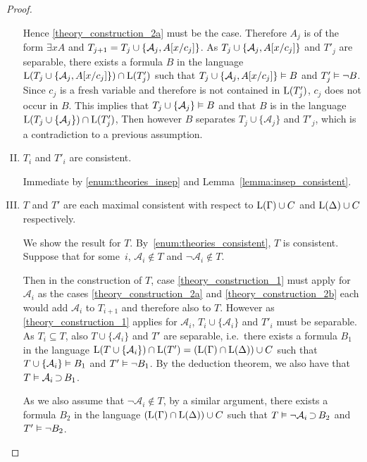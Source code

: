 \begin{proof}
\begin{enumerate}[I.]
			Hence \ref{theory_construction_2a} must be the case. Therefore $A_j$ is of the form $\exists x A$ and $T_{j+1} = T_{j} \cup \{ \mathcal{A}_{j}, A[x/c_j] \}$.
			As $T_{j} \cup \{ \mathcal{A}_{j}, A[x/c_j]  \}$ and $T'_j$ are separable, there exists a formula $B$ in the language $\operatorname{L}(T_{j} \cup \{ \mathcal{A}_{j}, A[x/c_j]  \}) \cap \operatorname{L}(T'_j)$
			such that $ T_{j} \cup \{ \mathcal{A}_{j}, A[x/c_j] \} \vDash B$ and $T'_j \vDash \lnot B$.
			Since $c_j$ is a fresh variable and therefore is not contained in $\operatorname{L}(T'_j)$, $c_j$ does not occur in $B$.
			This implies that $T_j \cup \{\mathcal{A}_j\} \vDash B$ and
			that $B$ is in the language $\operatorname{L}(T_{j} \cup \{ \mathcal{A}_{j}\}) \cap \operatorname{L}(T'_j)$,
			Then however $B$ separates $T_{j} \cup \{ \mathcal{A}_{j} \}$ and $T'_{j}$, which is a contradiction to a previous assumption. 


			\item 
			\label{enum:theories_consistent}
			$T_i$ and $T'_i$ are consistent.

			Immediate by \ref{enum:theories_insep} and Lemma~\ref{lemma:insep_consistent}.

		\item
			\label{enum:each_max_consistent}
			$T$ and $T'$ are each maximal consistent with respect to $\operatorname{L}(\Gamma) \cup C$ and $\operatorname{L}(\Delta) \cup C$ respectively.

			We show the result for $T$.
			By~\ref{enum:theories_consistent}, $T$ is consistent.
			Suppose that for some~$i$, $\mathcal{A}_i \not\in T$ and $\lnot\mathcal{A}_i \not\in T$.

			Then in the construction of $T$, case \ref{theory_construction_1} must apply for $\mathcal{A}_i$ as the cases \ref{theory_construction_2a} and \ref{theory_construction_2b} each would add $\mathcal{A}_i$ to $T_{i+1}$ and therefore also to $T$.
			However as \ref{theory_construction_1} applies for $\mathcal{A}_i$, $T_i \cup \{\mathcal{A}_i\}$ and $T'_i$ must be separable.
			As $T_i \subseteq T$, also
			$T \cup \{\mathcal{A}_i\}$ and $T'$ are separable, i.e.\ there exists a formula $B_1$ in the language $\operatorname{L}(T\cup\{\mathcal{A}_i\}) \cap \operatorname{L}(T') = (\operatorname{L}(\Gamma) \cap \operatorname{L}(\Delta)) \cup C$ such that
			$T \cup \{\mathcal{A}_i\} \vDash B_1$ and $T' \vDash \lnot B_1$.
			By the deduction theorem, we also have that \markA{}~$T \vDash \mathcal{A}_i \operatorname{\supset} B_1$.

			As we also assume that $\lnot \mathcal{A}_i \not\in T$, by a similar argument, there exists a formula $B_2$ in the language  $(\operatorname{L}(\Gamma) \cap \operatorname{L}(\Delta)) \cup C$ such that 
			\markB{} $T \vDash \lnot \mathcal{A}_i \operatorname{\supset} B_2$ and $T' \vDash \lnot B_2$.


\end{enumerate}
\end{proof}
